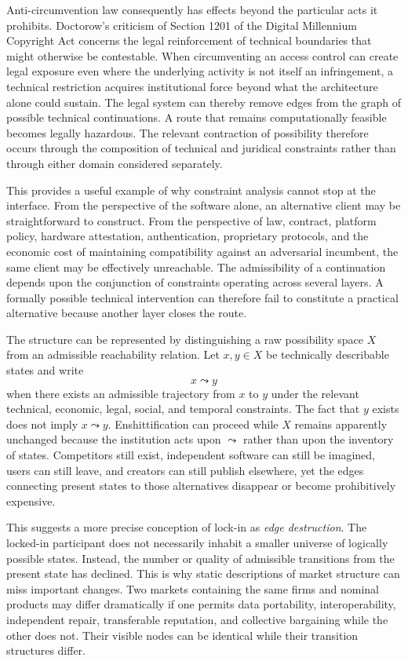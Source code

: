 \documentclass[11pt]{article}
\begin{document}
Anti-circumvention law consequently has effects beyond the particular acts it prohibits. Doctorow's criticism of Section 1201 of the Digital Millennium Copyright Act \citep{dmca1201} concerns the legal reinforcement of technical boundaries that might otherwise be contestable. When circumventing an access control can create legal exposure even where the underlying activity is not itself an infringement, a technical restriction acquires institutional force beyond what the architecture alone could sustain. The legal system can thereby remove edges from the graph of possible technical continuations. A route that remains computationally feasible becomes legally hazardous. The relevant contraction of possibility therefore occurs through the composition of technical and juridical constraints rather than through either domain considered separately.

This provides a useful example of why constraint analysis cannot stop at the interface. From the perspective of the software alone, an alternative client may be straightforward to construct. From the perspective of law, contract, platform policy, hardware attestation, authentication, proprietary protocols, and the economic cost of maintaining compatibility against an adversarial incumbent, the same client may be effectively unreachable. The admissibility of a continuation depends upon the conjunction of constraints operating across several layers. A formally possible technical intervention can therefore fail to constitute a practical alternative because another layer closes the route.

The structure can be represented by distinguishing a raw possibility space \(X\) from an admissible reachability relation. Let \(x,y\in X\) be technically describable states and write
\[
x \leadsto y
\]
when there exists an admissible trajectory from \(x\) to \(y\) under the relevant technical, economic, legal, social, and temporal constraints. The fact that \(y\) exists does not imply \(x\leadsto y\). Enshittification can proceed while \(X\) remains apparently unchanged because the institution acts upon \(\leadsto\) rather than upon the inventory of states. Competitors still exist, independent software can still be imagined, users can still leave, and creators can still publish elsewhere, yet the edges connecting present states to those alternatives disappear or become prohibitively expensive.

This suggests a more precise conception of lock-in as \emph{edge destruction}. The locked-in participant does not necessarily inhabit a smaller universe of logically possible states. Instead, the number or quality of admissible transitions from the present state has declined. This is why static descriptions of market structure can miss important changes. Two markets containing the same firms and nominal products may differ dramatically if one permits data portability, interoperability, independent repair, transferable reputation, and collective bargaining while the other does not. Their visible nodes can be identical while their transition structures differ.
\end{document}
